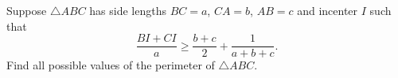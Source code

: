 Suppose $\triangle{ABC}$ has side lengths $BC=a$, $CA=b$, $AB=c$ and incenter $I$ such that \[\frac{BI+CI}{a}\geq\frac{b+c}{2}+\frac{1}{a+b+c}.\] Find all possible values of the perimeter of $\triangle{ABC}$.